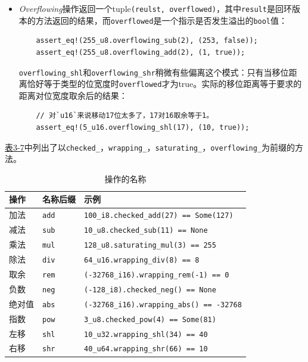 \begin{itemize}
    \item \emph{Overflowing}操作返回一个tuple\texttt{(reulst, overflowed)}，其中\texttt{result}是回环版本的方法返回的结果，而\texttt{overflowed}是一个指示是否发生溢出的\texttt{bool}值：
    \begin{verbatim}
    assert_eq!(255_u8.overflowing_sub(2), (253, false));
    assert_eq!(255_u8.overflowing_add(2), (1, true));
    \end{verbatim}
    \texttt{overflowing\_shl}和\texttt{overflowing\_shr}稍微有些偏离这个模式：只有当移位距离恰好等于类型的位宽度时\texttt{overflowed}才为true。实际的移位距离等于要求的距离对位宽度取余后的结果：
    \begin{verbatim}
    // 对`u16`来说移动17位太多了，17对16取余等于1。
    assert_eq!(5_u16.overflowing_shl(17), (10, true));
    \end{verbatim}
\end{itemize}

\hyperref[t3-7]{表3-7}中列出了以\texttt{checked\_}，\texttt{wrapping\_}，\texttt{saturating\_}，\texttt{overflowing\_}为前缀的方法。
\begin{table}[htbp]
    \centering
    \caption{操作的名称}
    \label{t3-7}
    \begin{tabular}{lll}
        \hline
        \textbf{操作}   & \textbf{名称后缀} &   示例 \\
        \hline
        加法    &   \texttt{add}    & \texttt{100\_i8.checked\_add(27) == Some(127)}    \\
        \rowcolor{tablecolor}
        减法    &   \texttt{sub}    & \texttt{10\_u8.checked\_sub(11) == None}      \\
        乘法    &   \texttt{mul}    & \texttt{128\_u8.saturating\_mul(3) == 255}    \\
        \rowcolor{tablecolor}
        除法    &   \texttt{div}    & \texttt{64\_u16.wrapping\_div(8) == 8}    \\
        取余    &   \texttt{rem}    & \texttt{(-32768\_i16).wrapping\_rem(-1) == 0} \\
        \rowcolor{tablecolor}
        负数    &   \texttt{neg}    & \texttt{(-128\_i8).checked\_neg() == None} \\
        绝对值  &   \texttt{abs}    & \texttt{(-32768\_i16).wrapping\_abs() == -32768} \\
        \rowcolor{tablecolor}
        指数    &   \texttt{pow}    & \texttt{3\_u8.checked\_pow(4) == Some(81)} \\
        左移    &   \texttt{shl}    & \texttt{10\_u32.wrapping\_shl(34) == 40}  \\
        \rowcolor{tablecolor}
        右移    &   \texttt{shr}    & \texttt{40\_u64.wrapping\_shr(66) == 10}  \\
    \end{tabular}
\end{table}

